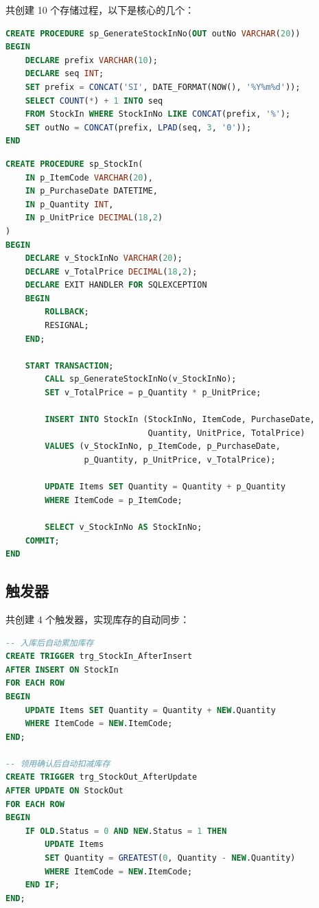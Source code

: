 \documentclass[12pt,a4paper]{ctexart}
\begin{document}
共创建 10 个存储过程，以下是核心的几个：

\begin{lstlisting}[language=SQL,caption=流水号生成存储过程]
CREATE PROCEDURE sp_GenerateStockInNo(OUT outNo VARCHAR(20))
BEGIN
    DECLARE prefix VARCHAR(10);
    DECLARE seq INT;
    SET prefix = CONCAT('SI', DATE_FORMAT(NOW(), '%Y%m%d'));
    SELECT COUNT(*) + 1 INTO seq
    FROM StockIn WHERE StockInNo LIKE CONCAT(prefix, '%');
    SET outNo = CONCAT(prefix, LPAD(seq, 3, '0'));
END
\end{lstlisting}

\begin{lstlisting}[language=SQL,caption=入库事务存储过程]
CREATE PROCEDURE sp_StockIn(
    IN p_ItemCode VARCHAR(20),
    IN p_PurchaseDate DATETIME,
    IN p_Quantity INT,
    IN p_UnitPrice DECIMAL(18,2)
)
BEGIN
    DECLARE v_StockInNo VARCHAR(20);
    DECLARE v_TotalPrice DECIMAL(18,2);
    DECLARE EXIT HANDLER FOR SQLEXCEPTION
    BEGIN
        ROLLBACK;
        RESIGNAL;
    END;

    START TRANSACTION;
        CALL sp_GenerateStockInNo(v_StockInNo);
        SET v_TotalPrice = p_Quantity * p_UnitPrice;

        INSERT INTO StockIn (StockInNo, ItemCode, PurchaseDate,
                             Quantity, UnitPrice, TotalPrice)
        VALUES (v_StockInNo, p_ItemCode, p_PurchaseDate,
                p_Quantity, p_UnitPrice, v_TotalPrice);

        UPDATE Items SET Quantity = Quantity + p_Quantity
        WHERE ItemCode = p_ItemCode;

        SELECT v_StockInNo AS StockInNo;
    COMMIT;
END
\end{lstlisting}

\subsection{触发器}

共创建 4 个触发器，实现库存的自动同步：

\begin{lstlisting}[language=SQL,caption=入库触发器和确认领用触发器]
-- 入库后自动累加库存
CREATE TRIGGER trg_StockIn_AfterInsert
AFTER INSERT ON StockIn
FOR EACH ROW
BEGIN
    UPDATE Items SET Quantity = Quantity + NEW.Quantity
    WHERE ItemCode = NEW.ItemCode;
END;

-- 领用确认后自动扣减库存
CREATE TRIGGER trg_StockOut_AfterUpdate
AFTER UPDATE ON StockOut
FOR EACH ROW
BEGIN
    IF OLD.Status = 0 AND NEW.Status = 1 THEN
        UPDATE Items
        SET Quantity = GREATEST(0, Quantity - NEW.Quantity)
        WHERE ItemCode = NEW.ItemCode;
    END IF;
END;
\end{lstlisting}
\end{document}
